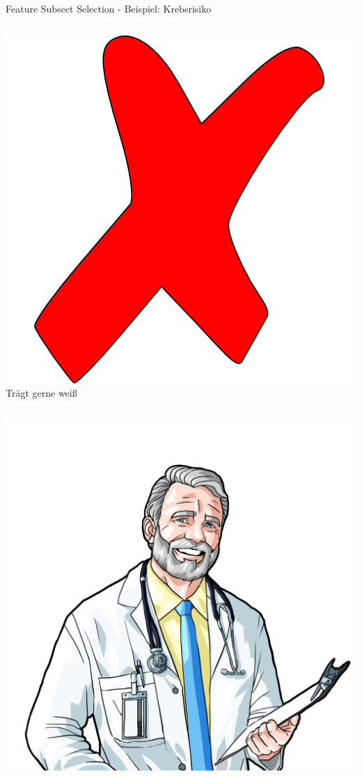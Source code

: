 \documentclass[xcolor=dvipsnames]{beamer}
\begin{document}
\begin{frame}{Feature Subsect Selection - Beispiel: Krebsrisiko}
\begin{columns}
\begin{column}{0.3\textwidth}
                     \includegraphics[width=(\textwidth / 3)]{img/cross.png}
                     Trägt gerne weiß
            \end{column}
        \end{columns}
        \begin{columns}
            \begin{column}{\textwidth}
                \center
                \includegraphics[width=(\textwidth / 2)]{img/concerned_doctor.png}
            \end{column}
        \end{columns}
    \end{frame}
    
\end{document}
